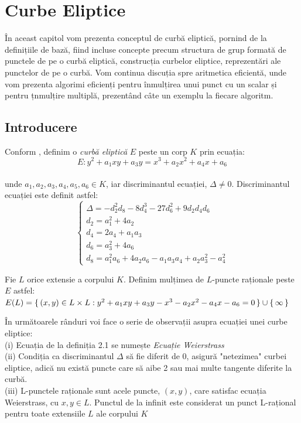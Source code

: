 \chapter{Curbe Eliptice} 

În aceast capitol vom prezenta conceptul de curbă eliptică, pornind de la definițiile de bază, fiind incluse concepte precum structura de grup formată de punctele de pe o curbă eliptică, construcția curbelor eliptice, reprezentări ale punctelor de pe o curbă. Vom continua discuția spre aritmetica eficientă, unde vom prezenta algorimi eficienți pentru înmulțirea unui punct cu un scalar și pentru țnmulțire multiplă, prezentând câte un exemplu la fiecare algoritm.

\section{Introducere}
\label{sec:sec01}

\begin{dfn}
Conform \cite{eccDefs}, definim o \textit{curbă eliptică} $E$ peste un corp $K$ prin ecuația:
$$E : y^2 + a_1xy + a_3y = x^3 + a_2x^{2} + a_4x + a_6$$ 
\\unde $a_1, a_2, a_3, a_4, a_5, a_6\in K$, iar discriminantul ecuației, $\Delta \neq 0$. Discriminantul ecuației este definit astfel:
$$ \begin{cases}
\Delta = -d_2^{2}d_8 - 8d_4^{3} - 27d_6^{2} + 9d_2d_4d_6 \\
d_2 = a_1^{2} + 4a_2 \\
d_4 = 2a_4 + a_1a_3 \\
d_6 = a_3^{2} + 4a_6 \\
d_8 = a_1^{2}a_6 + 4a_2a_6 - a_1a_3a_4 + a_2a_3^{2} - a_4^{2}
\end{cases}$$
\end{dfn}
\begin{dfn}
Fie $L$ orice extensie a corpului $K$. Definim mulțimea de $L$-puncte raționale peste $E$ astfel: $E(L) = \set {(x, y)\in L\times L: y^2 + a_1xy + a_3y - x^3 - a_2x^{2} - a_4x - a_6 = 0} \cup \set {\infty}$
\end{dfn}
\begin{obs}
În următoarele rânduri voi face o serie de observații asupra ecuației unei curbe eliptice: \\
(i) Ecuația de la definiția 2.1 se numește \textit{Ecuație Weierstrass} \\
(ii) Condiția ca discriminantul $\Delta$ să fie diferit de 0, asigură "netezimea" curbei eliptice, adică nu există puncte care să aibe 2 sau mai multe tangente diferite la curbă. \\
(iii) L-punctele raționale sunt acele puncte, $(x, y)$, care satisfac ecuația Weierstrass, cu $x, y \in L$. Punctul de la infinit este considerat un punct L-rațional pentru toate extensiile $L$ ale corpului $K$
\end{obs}

